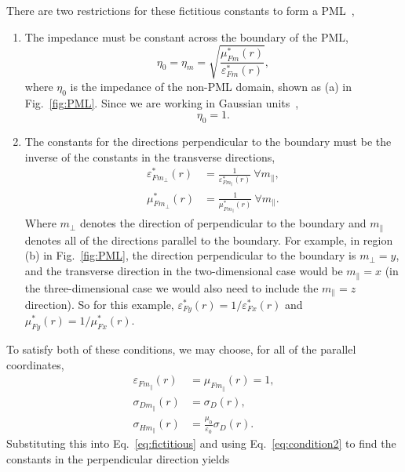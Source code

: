 \documentclass[12pt]{article}
\begin{document}
\begin{multicols}{2}
There are two restrictions for these fictitious constants to form a PML~\cite{Sacks95},
\begin{enumerate}
\item The impedance must be constant across the boundary of the PML,
\begin{equation}
\eta_0=\eta_m=\sqrt{\frac{\mu_{Fm}^*(r)}{\varepsilon_{Fm}^*(r)}},
\end{equation}
where $\eta_0$ is the impedance of the non-PML domain, shown as (a) in Fig.~\ref{fig:PML}. Since we are working in Gaussian units~\cite{Sullivan00,Kitano06},
\begin{equation}
\eta_0=1.
\end{equation}
\item The constants for the directions perpendicular to the boundary must be the inverse of the constants in the transverse directions,
\begin{equation}
\begin{aligned}
\label{eq:condition2}
\varepsilon_{Fm_\perp}^*(r)&=\frac{1}{\varepsilon_{Fm_\parallel}^*(r)}~\forall m_\parallel,\\
\mu_{Fm_\perp}^*(r)&=\frac{1}{\mu_{Fm_\parallel}^*(r)}~\forall m_\parallel.
\end{aligned}
\end{equation}
Where $m_\perp$ denotes the direction of perpendicular to the boundary and $m_\parallel$ denotes all of the directions parallel to the boundary. For example, in region (b) in Fig.~\ref{fig:PML}, the direction perpendicular to the boundary is $m_\perp=y$, and the transverse direction in the two-dimensional case would be $m_\parallel=x$ (in the three-dimensional case we would also need to include the $m_\parallel=z$ direction). So for this example, $\varepsilon_{Fy}^*(r)=1/\varepsilon_{Fx}^*(r)$ and $\mu_{Fy}^*(r)=1/\mu_{Fx}^*(r)$.
\end{enumerate}
To satisfy both of these conditions, we may choose, for all of the parallel coordinates,
\begin{equation}
\begin{aligned}
\varepsilon_{Fm_\parallel}(r)&=\mu_{Fm_\parallel}(r)=1,\\
\sigma_{Dm_\parallel}(r) &= \sigma_{D}(r),\\
\sigma_{Hm_\parallel}(r) &= \frac{\mu_0}{\varepsilon_0}\sigma_{D}(r).
\end{aligned}
\end{equation}
Substituting this into Eq.~\ref{eq:fictitious} and using Eq.~\ref{eq:condition2} to find the constants in the perpendicular direction yields

\end{multicols}
\end{document}
